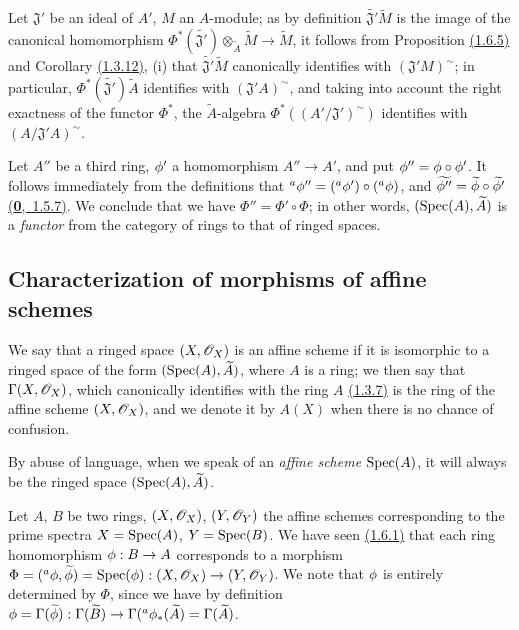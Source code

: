 \begin{env}[1.6.9]
\label{env-1.1.6.9}
Let $\mathfrak{J}'$ be an ideal of $A'$, $M$ an $A$-module; as by definition
$\widetilde{\mathfrak{J}'}\widetilde{M}$ is the image of the canonical homomorphism
$\Phi^*(\widetilde{\mathfrak{J}'})\otimes_{\widetilde{A}}\widetilde{M}\to\widetilde{M}$, it
follows from Proposition \hyperref[prop-1.1.6.5]{(1.6.5)} and
Corollary \hyperref[cor-1.1.3.12]{(1.3.12)}, (i) that
$\widetilde{\mathfrak{J}'}\widetilde{M}$ canonically identifies with $(\mathfrak{J}' M)^\sim$;
in particular, $\Phi^*(\widetilde{\mathfrak{J}'})\widetilde{A}$ identifies with
$(\mathfrak{J}' A)^\sim$, and taking into account the right exactness of the functor $\Phi^*$,
the $\widetilde{A}$-algebra $\Phi^*((A'/\mathfrak{J}')^\sim)$ identifies with
$(A/\mathfrak{J}' A)^\sim$.
\end{env}

\begin{env}[1.6.10]
\label{env-1.1.6.10}
Let $A''$ be a third ring, $\phi'$ a homomorphism $A''\to A'$, and put
$\phi''=\phi\circ\phi'$. It follows immediately from the definitions that
${}^a\phi''=({}^a\phi')\circ({}^a\phi)$, and
$\widetilde{\phi''}=\widetilde{\phi}\circ\widetilde{\phi'}$ \hyperref[env-0.1.5.7]{(\textbf{0},~1.5.7)}. We conclude
that we have $\Phi''=\Phi'\circ\Phi$; in other words, $({\mathop{\mathrm{Spec}}\nolimits}(A),\widetilde{A})$ is a
{\em functor} from the category of rings to that of ringed spaces.
\end{env}

\subsection{Characterization of morphisms of affine schemes}
\label{subsection-morphisms-affine-schemes}

\begin{defn}[1.7.1]
\label{defn-1.1.7.1}
We say that a ringed space $(X,\mathscr{O}_X)$ is an affine scheme if it is isomorphic to a ringed
space of the form $({\mathop{\mathrm{Spec}}\nolimits}(A),\widetilde{A})$, where $A$ is a ring; we then say that
$\Gamma(X,\mathscr{O}_X)$, which canonically identifies with the ring $A$ \hyperref[thm-1.1.3.7]{(1.3.7)} is the
ring of the affine scheme $(X,\mathscr{O}_X)$, and we denote it by $A(X)$ when there is no chance of
confusion.
\end{defn}

By abuse of language, when we speak of an {\em affine scheme ${\mathop{\mathrm{Spec}}\nolimits}(A)$}, it will always be
the ringed space $({\mathop{\mathrm{Spec}}\nolimits}(A),\widetilde{A})$.

\begin{env}[1.7.2]
\label{env-1.1.7.2}
Let $A$, $B$ be two rings, $(X,\mathscr{O}_X)$, $(Y,\mathscr{O}_Y)$ the affine schemes corresponding to
the prime spectra $X={\mathop{\mathrm{Spec}}\nolimits}(A)$, $Y={\mathop{\mathrm{Spec}}\nolimits}(B)$. We have seen \hyperref[env-1.1.6.1]{(1.6.1)} that each ring
homomorphism $\phi:B\to A$ corresponds to a morphism
$\Phi=({}^a\phi,\widetilde{\phi})={\mathop{\mathrm{Spec}}\nolimits}(\phi):(X,\mathscr{O}_X)\to(Y,\mathscr{O}_Y)$. We note that $\phi$
is entirely determined by $\Phi$, since we have by definition
$\phi=\Gamma(\widetilde{\phi}):\Gamma(\widetilde{B})
\to\Gamma({}^a\phi_*(\widetilde{A})=\Gamma(\widetilde{A})$.
\end{env}

